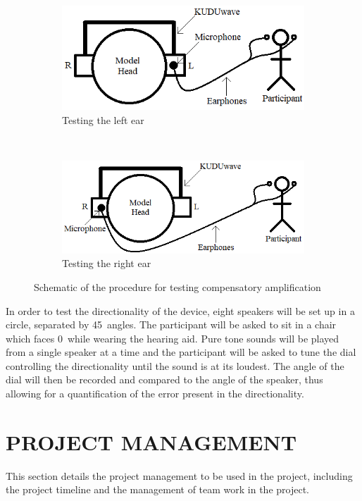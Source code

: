 \documentclass[10pt,twocolumn]{witseiepaper}
\begin{document}
\begin{figure}[h]
	\centering
	\begin{subfigure}[t]{0.5\textwidth}
		\centering
		\includegraphics[width=0.8\columnwidth]{gainTestingLeft.png}
		\caption{Testing the left ear}
	\end{subfigure}%
	\\
	\begin{subfigure}[t]{0.5\textwidth}
		\centering
		\includegraphics[width=0.8\columnwidth]{gainTestingRight.png}
		\caption{Testing the right ear}
	\end{subfigure}
	\caption{Schematic of the procedure for testing compensatory amplification}
	\label{fig:testing}	
\end{figure}

In order to test the directionality of the device, eight speakers will be set up in a circle, separated by 45\textdegree\ angles. The participant will be asked to sit in a chair which faces 0\textdegree\  while wearing the hearing aid. Pure tone sounds will be played from a single speaker at a time and the participant will be asked to tune the dial controlling the directionality until the sound is at its loudest. The angle of the dial will then be recorded and compared to the angle of the speaker, thus allowing for a quantification of the error present in the directionality. 

\section{PROJECT MANAGEMENT}
This section details the project management to be used in the project, including the project timeline and the management of team work in the project.
\end{document}
